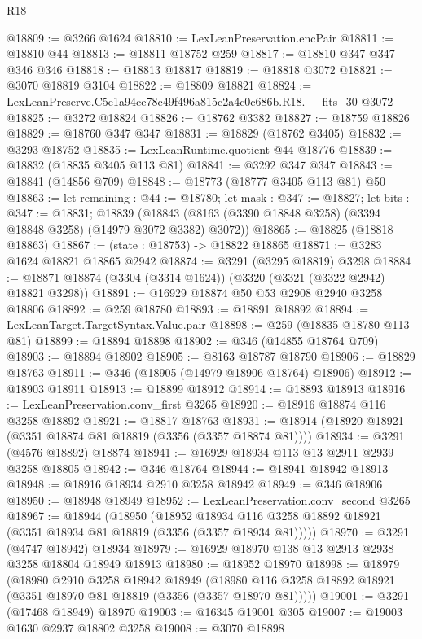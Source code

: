 \begin{lexlean}{R18}
\begin{coremodule}
@18809 := @3266 @1624
@18810 := LexLeanPreservation.encPair
@18811 := @18810 @44
@18813 := @18811 @18752 @259
@18817 := @18810 @347 @347 @346 @346
@18818 := @18813 @18817
@18819 := @18818 @3072
@18821 := @3070 @18819 @3104
@18822 := @18809 @18821
@18824 := LexLeanPreserve.C5e1a94ce78c49f496a815c2a4c0c686b.R18.__fits_30 @3072
@18825 := @3272 @18824
@18826 := @18762 @3382
@18827 := @18759 @18826
@18829 := @18760 @347 @347
@18831 := @18829 (@18762 @3405)
@18832 := @3293 @18752
@18835 := LexLeanRuntime.quotient @44 @18776
@18839 := @18832 (@18835 @3405 @113 @81)
@18841 := @3292 @347 @347
@18843 := @18841 (@14856 @709)
@18848 := @18773 (@18777 @3405 @113 @81) @50
@18863 := let remaining : @44 := @18780;
  let mask : @347 := @18827;
  let bits : @347 := @18831;
  @18839 (@18843 (@8163 (@3390 @18848 @3258) (@3394 @18848 @3258) (@14979 @3072 @3382) @3072))
@18865 := @18825 (@18818 @18863)
@18867 := (state : @18753) -> @18822 @18865
@18871 := @3283 @1624 @18821 @18865 @2942
@18874 := @3291 (@3295 @18819) @3298
@18884 := @18871 @18874 (@3304 (@3314 @1624)) (@3320 (@3321 (@3322 @2942) @18821 @3298))
@18891 := @16929 @18874 @50 @53 @2908 @2940 @3258 @18806
@18892 := @259 @18780
@18893 := @18891 @18892
@18894 := LexLeanTarget.TargetSyntax.Value.pair
@18898 := @259 (@18835 @18780 @113 @81)
@18899 := @18894 @18898
@18902 := @346 (@14855 @18764 @709)
@18903 := @18894 @18902
@18905 := @8163 @18787 @18790
@18906 := @18829 @18763
@18911 := @346 (@18905 (@14979 @18906 @18764) @18906)
@18912 := @18903 @18911
@18913 := @18899 @18912
@18914 := @18893 @18913
@18916 := LexLeanPreservation.conv_first @3265
@18920 := @18916 @18874 @116 @3258 @18892
@18921 := @18817 @18763
@18931 := @18914 (@18920 @18921 (@3351 @18874 @81 @18819 (@3356 (@3357 @18874 @81))))
@18934 := @3291 (@4576 @18892) @18874
@18941 := @16929 @18934 @113 @13 @2911 @2939 @3258 @18805
@18942 := @346 @18764
@18944 := @18941 @18942 @18913
@18948 := @18916 @18934 @2910 @3258 @18942
@18949 := @346 @18906
@18950 := @18948 @18949
@18952 := LexLeanPreservation.conv_second @3265
@18967 := @18944
    (@18950
      (@18952 @18934 @116 @3258 @18892 @18921 (@3351 @18934 @81 @18819 (@3356 (@3357 @18934 @81)))))
@18970 := @3291 (@4747 @18942) @18934
@18979 := @16929 @18970 @138 @13 @2913 @2938 @3258 @18804 @18949 @18913
@18980 := @18952 @18970
@18998 := @18979
    (@18980
      @2910
      @3258
      @18942
      @18949
      (@18980 @116 @3258 @18892 @18921 (@3351 @18970 @81 @18819 (@3356 (@3357 @18970 @81)))))
@19001 := @3291 (@17468 @18949) @18970
@19003 := @16345 @19001 @305
@19007 := @19003 @1630 @2937 @18802 @3258
@19008 := @3070 @18898

\end{coremodule}
\end{lexlean}
